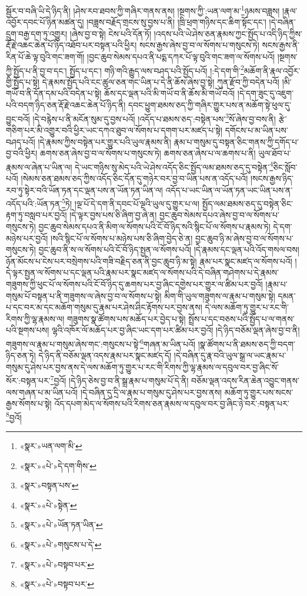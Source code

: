 སྦྱོར་བ་བཞི་ཡི་དེ་ཉིད་ནི། །ཤེས་རབ་ཐབས་ཀྱི་གཞིར་གནས་ནས། །སྔགས་ཀྱི་:ཡན་ལག་མ་\footnote{«སྣར་»ཡན་ལག་མི་}ཉམས་བཟླས། །རྣལ་འབྱོར་དབང་པོ་ཉིན་མཚན་དུ། །བཟླས་བརྗོད་གྲངས་སུ་བྱས་པ་ནི། །ཁྲི་ཕྲག་གཉིས་དང་ཆིག་སྟོང་དང་། །དེ་བཞིན་དྲུག་བརྒྱ་དག་ཏུ་འགྱུར། །ཞེས་བྱ་བ་སྟེ། ངེས་པའི་དོན་ཏོ། །འདས་པའི་ཡེ་ཤེས་ཅན་རྣམས་ཀྱང་སྤྱོད་པ་འདི་ཉིད་ཀྱིས་རྡོ་རྗེ་འཆང་ཆེན་པོ་ཉིད་འཐོབ་པར་བསྟན་པའི་ཕྱིར། སངས་རྒྱས་ཞེས་བྱ་བ་ལ་སོགས་པ་གསུངས་ཏེ། སངས་རྒྱས་ནི་རིན་པོ་ཆེ་ལྟ་བུའི་གང་ཟག་གོ། །བྱང་ཆུབ་སེམས་དཔའ་ནི་པདྨ་དཀར་པོ་ལྟ་བུའི་གང་ཟག་ལ་སོགས་པའོ། །སྔགས་ཀྱི་སྤྱོད་པ་ནི་བྱ་བ་དང་། སྤྱོད་པ་དང་། གཉི་གའི་རྒྱུད་ལས་བཤད་པའི་སྤྱོད་པའོ། །:དེ་དག་གི་\footnote{«སྣར་»«པེ་»དེ་དག་གིས་}མཆོག་ནི་རྣལ་འབྱོར་གྱི་སྤྱོད་པ་སྟེ། དེ་རྣམས་སྤྱོད་པའི་ངང་ཚུལ་ཅན་གང་ཡིན་པ་དེ་ནི་ཆོས་ཞེས་བྱ་སྟེ། ཀུན་རྫོབ་ཀྱི་བདེན་པའོ། །མི་གཡོ་བ་ནི་དོན་དམ་པའི་བདེན་པ་སྟེ། ཆོས་དང་ལྡན་པའི་མི་གཡོ་བ་ནི་ཆོས་མི་གཡོ་བའོ། །དེ་དག་ཟུང་དུ་འཇུག་པའི་བདག་ཉིད་ཅན་རྡོ་རྗེ་འཆང་ཆེན་པོ་ཉིད་ནི། དབང་ཕྱུག་ཐམས་ཅད་ཀྱི་གཞིར་གྱུར་པས་ན་མཆོག་སྟེ་ཕུལ་དུ་བྱུང་བའོ། །དེ་བརྙེས་པ་ནི་མངོན་སུམ་དུ་བྱས་པའོ། །འདོད་པ་ཐམས་ཅད་:བསྟེན་པས་\footnote{«སྣར་»བསྟན་པས་}སོ་ཞེས་བྱ་བས་ནི། རྩེ་གཅིག་པར་མི་འགྱུར་བའི་ཕྱིར་ཡང་དཀའ་ཐུབ་ལ་སོགས་པ་དགག་པར་མཛད་པ་སྟེ། དགོངས་པ་མ་ཡིན་པས་བཤད་པའོ། །དེ་རྣམས་ཀྱིས་བསྟེན་པར་གྱུར་པའི་ཡུལ་རྣམས་ནི། རྣམ་པ་གསུམ་དུ་བསྟན་ཅིང་གནས་ཀྱི་དགོད་པ་བྱ་བའི་ཕྱིར། ཆགས་ཅན་ཞེས་བྱ་བ་ལ་སོགས་པ་གསུངས་ཏེ། ཆགས་ཅན་ཞེས་པ་ལ་ཆགས་པ་ནི། ཡུལ་ཐོབ་པ་རྣམས་ལ་ཞེན་པ་ཡིན་ལ། དེ་ཡང་གཉིས་སུ་མེད་པའི་ཡེ་ཤེས་འདོད་ཅིང་སྤྱོད་ལམ་ཐམས་ཅད་དུ་བསྟེན་\footnote{«སྣར་»«པེ་»སྟེན་}ཅིང་སློབ་པའོ། །སེམས་ཅན་ཐམས་ཅད་ཀྱིས་འདོད་ཅིང་དོན་དུ་གཉེར་བར་བྱ་བ་ཡིན་པས་ན་འདོད་པའོ། །སངས་རྒྱས་ཉིད་རབ་ཏུ་སྟེར་བའི་ཡོན་ཏན་དང་ལྡན་པས་ན་ཡོན་ཏན་ཡིན་ལ། འདོད་པ་ཡང་ཡིན་ལ་ཡོན་ཏན་ཡང་ཡིན་པས་ན་འདོད་པའི་:ཡོན་ཏན་\footnote{«སྣར་»«པེ་»ཡོན་ཏན་ཡིན་}ཏེ། །ལྔ་པོ་དེ་དག་ནི་དབང་པོ་ལྔའི་ཡུལ་དུ་གྱུར་པ་ལ། སྤྱོད་ལམ་ཐམས་ཅད་དུ་བསྟེན་ཅིང་རྟག་ཏུ་བསླབ་པར་བྱའོ། །དེ་ལྟར་བྱས་པས་ཅི་ཞིག་བྱ་ཞེ་ན། བྱང་ཆུབ་སེམས་དཔའ་ཞེས་བྱ་བ་ལ་སོགས་པ་གསུངས་ཏེ། བྱང་ཆུབ་སེམས་དཔའ་ནི་མིག་ལ་སོགས་པའི་ངོ་བོ་ཉིད་སའི་སྙིང་པོ་ལ་སོགས་པ་རྣམས་ཏེ། དེ་དག་མཉེས་པར་བྱའོ། །སའི་སྙིང་པོ་ལ་སོགས་པ་མཉེས་པས་ཅི་ཞིག་བྱེད་ཅེ་ན། བྱང་ཆུབ་ཉི་མ་ཞེས་བྱ་བ་ལ་སོགས་པ་གསུངས་ཏེ། བྱང་ཆུབ་ནི་ས་ལ་སོགས་པའི་ངོ་བོ་ཉིད་སྤྱན་ལ་སོགས་པའོ། །དེ་རྣམས་དང་ལྡན་པའི་འོད་གསལ་བས། ཉོན་མོངས་པ་ངེས་པར་བསྲེགས་པའི་གཟི་བརྗིད་ཅན་ནི་བྱང་ཆུབ་ཉི་མ་སྟེ། རྣམ་པར་སྣང་མཛད་ལ་སོགས་པའོ། །དེ་ལྟར་སྤྱན་ལ་སོགས་པ་དང་ལྡན་པའི་རྣམ་པར་སྣང་མཛད་ལ་སོགས་པའི་དེ་བཞིན་གཤེགས་པ་དེ་རྣམས་གཟུགས་ཀྱི་ཕུང་པོ་ལ་སོགས་པའི་ངོ་བོ་ཉིད་དུ་ཆགས་པར་བྱ་ཞིང་དགྱེས་པར་གྱུར་ལ་ཚིམ་པར་བྱའོ། །རྣམ་པ་གསུམ་པོ་བསྟན་པ་ནི་གཟུགས་ལ་ཞེས་བྱ་བ་ལ་སོགས་པ་སྟེ། མིག་གི་ཡུལ་གཟུགས་ལ་རྣམ་པ་གསུམ་སྟེ། དམན་པ་དང་བར་མ་དང་མཆོག་གསུམ་དུ་རྣམ་པར་ཤེས་ཤིང་རྟོགས་པར་བྱས་ནས། དེ་ལས་མཆོག་ཏུ་གྱུར་པ་རང་གི་རིགས་ཀྱི་ལྷ་རྣམས་ལ། གཟུགས་སྣ་ཚོགས་པས་མཆོད་པར་བྱེད་པ་སྟེ། སྤྲོས་པ་དང་བཅས་པའི་སྤྱོད་པ་ལ་གནས་པའི་སྔགས་པས། ལྷའི་འཁོར་ལོ་མཆོད་པར་བྱ་ཞིང་ཡང་དག་པར་ཚིམ་པར་བྱའོ། །དེ་ཉིད་བཅོམ་ལྡན་ཞེས་བྱ་བ་ནི། གཟུགས་ལ་རྣམ་པ་གསུམ་ཞེས་གང་:གསུངས་པ་སྟེ་\footnote{«སྣར་»«པེ་»གསུངས་པ་དེ་}གཞན་མ་ཡིན་པའོ། །སྣ་ཚོགས་པ་ནི་ཐམས་ཅད་ཀྱི་བདག་ཉིད་ཅན་ཏེ། དེ་ཉིད་ནི་བཅོམ་ལྡན་འདས་རྣམ་པར་སྣང་མཛད་དོ། །དེ་བཞིན་དུ་རྣ་བའི་ཡུལ་སྒྲ་ལ་ཡང་རྣམ་པ་གསུམ་དུ་ཤེས་པར་བྱས་ནས་དེ་ལས་མཆོག་ཏུ་གྱུར་པ་རང་གི་རིགས་ཀྱི་ལྷ་རྣམས་ལ་དབུལ་བར་བྱ་ཞིང་སོ་སོར་:བསྟན་པར་\footnote{«སྣར་»«པེ་»བསྟབ་པར་}བྱའོ། །དེ་ཉིད་ཅེས་བྱ་བ་ནི་སྒྲ་རྣམ་པ་གསུམ་པོ་དེ་ནི། བཅོམ་ལྡན་འདས་རིན་ཆེན་འབྱུང་གནས་ལས་གཞན་པ་མ་ཡིན་པའོ། །དེ་བཞིན་དུ་དྲི་ལ་རྣམ་པ་གསུམ་དུ་ཤེས་པར་བྱས་ནས། མཆོག་ཏུ་གྱུར་པས་སངས་རྒྱས་སོགས་པ་སྟེ། འོད་དཔག་མེད་ལ་སོགས་པའི་རིགས་ཅན་རྣམས་ལ་དབུལ་བར་བྱ་ཞིང་ཉེ་བར་:བསྟན་པར་\footnote{«སྣར་»«པེ་»བསྟབ་པར་}བྱའོ། 